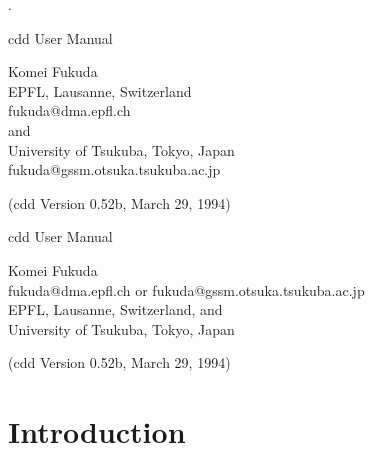 %
\renewcommand{\baselinestretch}{1.0}
\setlength{\oddsidemargin}{8mm}
\setlength{\textwidth}{16cm}
\setlength{\topmargin}{10mm}
\setlength{\textheight}{23cm}
\setlength{\headsep}{0in}
\setlength{\headheight}{0pt}

\pagestyle{empty}



.\vspace{20mm}

\begin{center}



\vspace{20mm}

{\LARGE cdd User Manual}

\vspace{20mm}

{\Large Komei Fukuda\\
   EPFL, Lausanne, Switzerland\\
   fukuda@dma.epfl.ch\\
   and\\
   University of Tsukuba, Tokyo, Japan\\
  fukuda@gssm.otsuka.tsukuba.ac.jp
}

\vspace{20mm}
{\Large (cdd Version 0.52b,  March 29, 1994)}

\end{center}

\newpage
\pagestyle{plain}
\setcounter{page}{1} 

\begin{center}

{\Large cdd User Manual}

\bigskip
{\large Komei Fukuda\\
   fukuda@dma.epfl.ch  or  fukuda@gssm.otsuka.tsukuba.ac.jp\\
   EPFL, Lausanne, Switzerland, and\\
   University of Tsukuba, Tokyo, Japan}

\bigskip
{\large (cdd Version 0.52b,  March 29, 1994)}

\end{center}

\section{Introduction} \label{INTRODUCTION}

